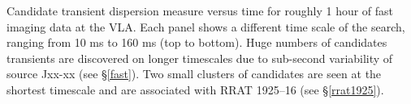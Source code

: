 Candidate transient dispersion measure versus time for roughly 1 hour of fast imaging data at the VLA. Each panel shows a different time scale of the search, ranging from 10 ms to 160 ms (top to bottom). Huge numbers of candidates transients are discovered on longer timescales due to sub-second variability of source Jxx-xx (see \S \ref{fast}). Two small clusters of candidates are seen at the shortest timescale and are associated with RRAT 1925--16 (see \S \ref{rrat1925}).
